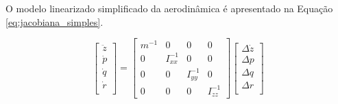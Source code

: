 \documentclass[main.tex]{subfiles}
\begin{document}
O modelo linearizado simplificado da aerodinâmica é apresentado na Equação \ref{eq:jacobiana_simples}.

\begin{equation}\label{eq:jacobiana_simples}
	\begin{bmatrix}
		\ddot{z}\\
		\dot{p}\\
		\dot{q}\\
		\dot{r}\\
	\end{bmatrix} = \begin{bmatrix}
		m^{-1} & 0 & 0 & 0\\
		
		0 & I_{xx}^{-1} & 0 & 0\\
		
		0 & 0 & I_{yy}^{-1} & 0\\
		
		0 & 0 & 0 & I_{zz}^{-1}
	\end{bmatrix}\begin{bmatrix}
		\Delta \dot{z}\\
		\Delta p\\
		\Delta q\\
		\Delta r\\
	\end{bmatrix}
\end{equation}
\end{document}

